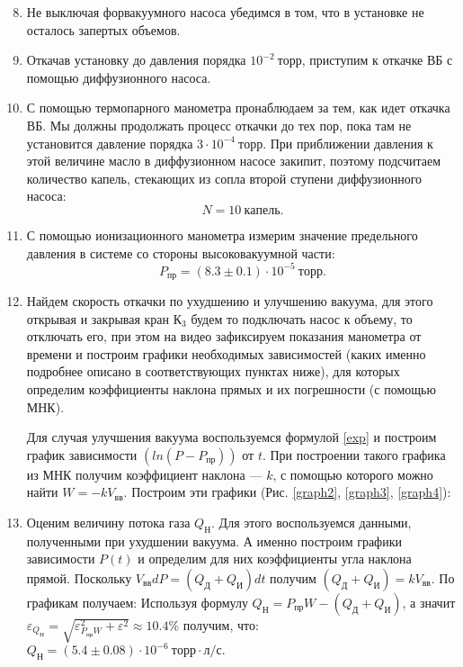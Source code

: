 \documentclass[a4paper,12pt]{article}
\begin{document}
\begin{enumerate}
  \setcounter{enumi}{7}

  \item Не выключая форвакуумного насоса убедимся в том, что в установке не осталось запертых объемов.

  \item Откачав установку до давления порядка $ 10^{-2}~торр$, приступим к откачке ВБ с помощью диффузионного насоса.


  \item С помощью термопарного манометра пронаблюдаем за тем, как идет откачка ВБ. Мы должны продолжать процесс откачки до тех пор, пока там не установится давление порядка $3 \cdot 10^{-4}~торр.$ При приближении давления к этой величине масло в диффузионном насосе закипит, поэтому подсчитаем количество капель, стекающих из сопла второй ступени диффузионного насоса: $$ N = 10 ~ капель.$$

  \item С помощью ионизационного манометра измерим значение предельного давления в системе со стороны высоковакуумной части: $$P_{пр} = (8.3 \pm 0.1)  \cdot 10^{-5} ~торр.$$


  \item Найдем скорость откачки по ухудшению и улучшению вакуума, для этого открывая и закрывая кран $К_3$ будем то подключать насос к объему, то отключать его, при этом на видео зафиксируем показания манометра от времени и построим графики необходимых  зависимостей (каких именно подробнее описано в соответствующих пунктах ниже), для которых определим коэффициенты наклона прямых и их погрешности (с помощью МНК).

        Для случая улучшения вакуума воспользуемся формулой \eqref{exp} и построим график зависимости $(ln(P-P_{пр}))$ от $t$. При построении такого графика из МНК получим коэффициент наклона --- $k$, с помощью которого можно найти $W = -kV_{вв}$. Построим эти графики (Рис. \ref{graph2}, \ref{graph3}, \ref{graph4}):
  \item Оценим величину потока газа  $Q_Н$. Для этого воспользуемся данными, полученными при ухудшении вакуума. А именно построим графики зависимости $P(t)$ и определим для них коэффициенты угла наклона прямой. Поскольку $V_{вв}dP = (Q_Д + Q_И) dt$ получим $(Q_Д + Q_И) = kV_{вв}$. По графикам получаем:
        Используя формулу $Q_Н = P_{пр}W - (Q_Д + Q_И)$, а значит $\varepsilon_{Q_Н} =  \sqrt{\varepsilon_{P_{пр}W}^2 + \varepsilon^2} \approx 10.4\%$ получим, что: $Q_Н = (5.4 \pm 0.08) \cdot 10^{-6} ~ торр \cdot л / с.$




\end{enumerate}
\end{document}
